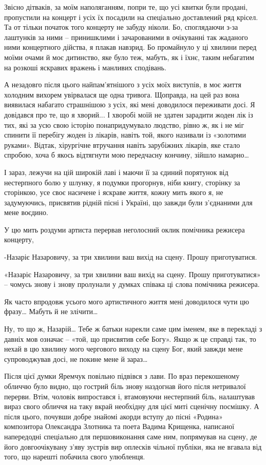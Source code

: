 Звісно дітваків, за моїм наполяганням, попри те, що усі квитки були продані,
пропустили на концерт і усіх їх посадили на спеціально доставлений ряд крісел.
Та от тільки початок того концерту не забуду ніколи. Бо, споглядаючи з-за
лаштунків за ними – принишклими і зачарованими в очікуванні так жаданого ними
концертного дійства, я плакав навзрид. Бо промайнуло у ці хвилини перед моїми
очами й моє дитинство, яке було теж, мабуть, як і їхнє, таким небагатим на
розкоші яскравих вражень і манливих сподівань.

А незадовго після цього найпам’ятнішого з усіх моїх виступів, в моє життя
холодним вихорем увірвалася ще одна тривога. Щоправда, на цей раз вона
виявилася набагато страшнішою з усіх, які мені доводилося переживати досі. Я
довідався про те, що я хворий... І хворобі моїй не здатен зарадити жоден лік із
тих, які за усю свою історію понапридумувало людство, рівно ж, як і не міг
спинити її перебігу жоден із лікарів, навіть той, якого називали із «золотими
руками». Відтак, хірургічне втручання навіть зарубіжних лікарів, яке стало
спробою, хоча б якось відтягнути мою передчасну кончину, зійшло намарно… 

І зараз, лежучи на цій широкій лаві і маючи її за єдиний порятунок від
нестерпного болю у шлунку, я подумки прогорнув, ніби книгу, сторінку за
сторінкою, усе своє насичене і яскраве життя, кожну мить якого я, не
задумуючись, присвятив рідній пісні і Україні, що завжди були з’єднаними для
мене воєдино.

У цю мить роздуми артиста перервав неголосний оклик помічника режисера
концерту, 

-Назаріє Назаровичу, за три хвилини ваш вихід на сцену. Прошу приготуватися.

«Назаріє Назаровичу, за три хвилини ваш вихід на сцену. Прошу приготуватися» –
чомусь знову і знову  пролунали у думках співака ці слова помічника режисера. 

Як часто впродовж усього мого артистичного життя мені доводилося чути цю фразу…
Мабуть й не злічити… 

Ну, то що ж, Назарій… Тебе ж батьки нарекли саме цим іменем, яке в перекладі з
давніх мов означає – «той, що присвятив себе Богу». Якщо ж це справді так, то
нехай в цю хвилину мого чергового виходу на сцену Бог, який завжди мене
супроводжував досі, не покине мене й зараз…

Після цієї думки Яремчук повільно підвівся з лави. По враз перекошеному обличчю
було видно, що гострий біль знову наздогнав його після нетривалої перерви.
Втім, чоловік випростався і, втамовуючи нестерпний біль, налаштував вираз свого
обличчя на таку вкрай необхідну для цієї миті сценічну посмішку. А після цього,
почувши добре знайомі акорди вступу до пісні «Родина» композитора Олександра
Злотника та поета Вадима Крищенка, написаної напередодні спеціально для
першовиконання саме ним, попрямував на сцену, де його довгоочікувану з’яву
зустрів вир оплесків чільної публіки, яка не вгавала від того, що нарешті
побачила свого улюбленця.


